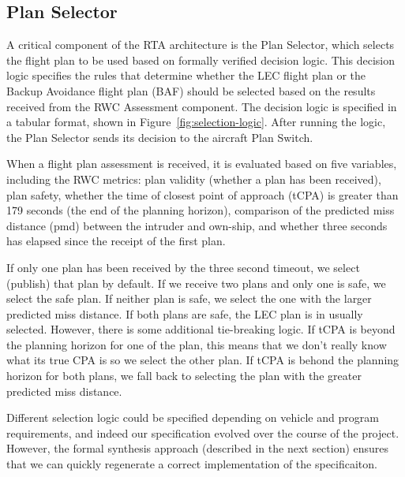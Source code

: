 \subsection{Plan Selector}




A critical component of the RTA architecture is the Plan Selector, which selects the flight
plan to be used based on formally verified decision logic. This decision logic specifies the rules
that determine whether the LEC flight plan or the Backup Avoidance flight plan (BAF) should 
be selected based on the results received from the RWC Assessment component. The 
decision logic is specified in a tabular format, shown in Figure~\ref{fig:selection-logic}.
After running the logic, the Plan Selector sends its decision to the
aircraft Plan Switch.

When a flight plan assessment is received, it is evaluated based on five
variables, including the RWC metrics:  plan validity (whether a plan has been received), plan
safety, whether the time of closest point of approach (tCPA) is greater than
179 seconds (the end of the planning horizon), comparison of the predicted miss
distance (pmd) between the intruder and own-ship, and whether three seconds has elapsed since the
receipt of the first plan. 

If only one plan has been received by the three second timeout, we select (publish)
that plan by default.  
If we receive two plans and only one is safe, we select the safe plan.  
If neither plan is safe, we select the one with the larger predicted miss distance.  
If both plans are safe, the LEC plan is in usually selected.  However, there is some 
additional tie-breaking logic.  
If tCPA is beyond the planning horizon for one of the plan, this means that we don't really know what 
its true CPA is so we select the other plan.  
If tCPA is behond the planning horizon for both plans, we fall back to selecting the plan with 
the greater predicted miss distance.  

Different selection logic could be specified depending on vehicle and program requirements, 
and indeed our specification evolved over the course of the project.  However, the 
formal synthesis approach (described in the next section) ensures that we can 
quickly regenerate a correct implementation of the specificaiton.  


